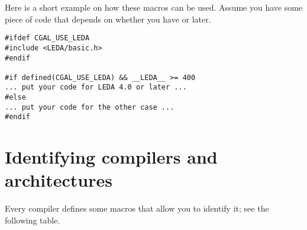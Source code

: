 Here is a short example on how these macros can be used. Assume you have some
piece of code that depends on whether you have  or later.
\begin{verbatim}
#ifdef CGAL_USE_LEDA
#include <LEDA/basic.h>
#endif

#if defined(CGAL_USE_LEDA) && __LEDA__ >= 400
... put your code for LEDA 4.0 or later ...
#else
... put your code for the other case ...
#endif 
\end{verbatim}

\section{Identifying compilers and architectures}
\label{sec:which_compiler}

Every compiler defines some macros that allow you to identify it; see 
the following table.

\vspace{5mm}\vspace{5mm}

